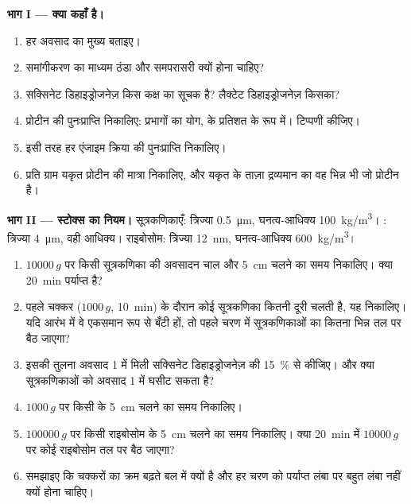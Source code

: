 \begin{problem}
\medskip
\noindent\textbf{भाग I --- क्या कहाँ है।}
\begin{enumerate}
  \item हर अवसाद का मुख्य  बताइए।
  \item समांगीकरण का माध्यम ठंडा और समपरासरी क्यों होना चाहिए?
  \item सक्सिनेट डिहाइड्रोजनेज़ किस कक्ष का सूचक है? लैक्टेट
        डिहाइड्रोजनेज़ किसका?
  \item प्रोटीन की पुनःप्राप्ति निकालिए: प्रभागों का योग,  के
        प्रतिशत के रूप में। टिप्पणी कीजिए।
  \item इसी तरह हर एंजाइम क्रिया की पुनःप्राप्ति निकालिए।
  \item प्रति ग्राम यकृत प्रोटीन की मात्रा निकालिए, और यकृत के ताज़ा
        द्रव्यमान का वह भिन्न भी जो प्रोटीन है।
\end{enumerate}

\medskip
\noindent\textbf{भाग II --- स्टोक्स का नियम।}
सूत्रकणिकाएँ: त्रिज्या \qty{0.5}{\micro m}, घनत्व-आधिक्य
\qty{100}{kg/m^3}। : त्रिज्या \qty{4}{\micro m}, वही आधिक्य।
राइबोसोम: त्रिज्या \qty{12}{nm}, घनत्व-आधिक्य \qty{600}{kg/m^3}।
\begin{enumerate}[resume]
  \item $\num{10000}\,g$ पर किसी सूत्रकणिका की अवसादन चाल और
        \qty{5}{cm} चलने का समय निकालिए। क्या \qty{20}{min} पर्याप्त
        है?
  \item पहले चक्कर ($1000\,g$, \qty{10}{min}) के दौरान कोई सूत्रकणिका
        कितनी दूरी चलती है, यह निकालिए। यदि आरंभ में वे एकसमान रूप से
        बँटी हों, तो पहले चरण में सूत्रकणिकाओं का कितना भिन्न तल पर बैठ
        जाएगा?
  \item इसकी तुलना अवसाद 1 में मिली सक्सिनेट डिहाइड्रोजनेज़ की
        \qty{15}{\%} से कीजिए। और क्या सूत्रकणिकाओं को अवसाद 1 में घसीट
        सकता है?
  \item $1000\,g$ पर किसी  के \qty{5}{cm} चलने का समय निकालिए।
  \item $\num{100000}\,g$ पर किसी राइबोसोम के \qty{5}{cm} चलने का समय
        निकालिए। क्या \qty{20}{min} में $\num{10000}\,g$ पर कोई राइबोसोम
        तल पर बैठ जाएगा?
  \item समझाइए कि चक्करों का क्रम बढ़ते बल में क्यों है और हर चरण को
        पर्याप्त लंबा पर बहुत लंबा नहीं क्यों होना चाहिए।
\end{enumerate}


\end{problem}
